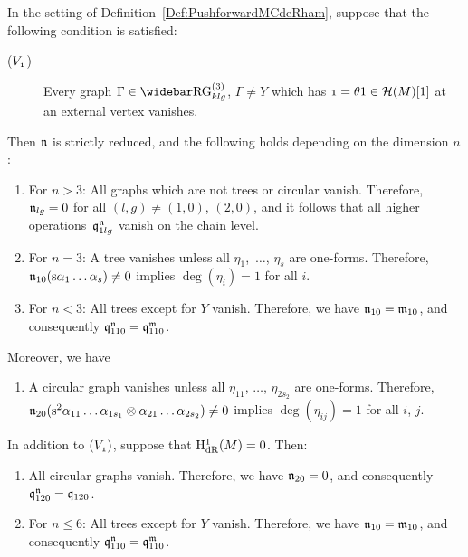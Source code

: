 \documentclass[\MainFolder/Text.tex]{subfiles}
\begin{document}
\begin{Proposition} \label{Prop:PMCEqualsMC}
In the setting of Definition~\ref{Def:PushforwardMCdeRham}, suppose that the following condition is satisfied: 
\begin{description}
\item[($V_{\NOne}$)] Every graph $\Gamma \in \TRRG_{klg}$, $\Gamma \neq Y$ which has $\NOne = \SuspU 1\in \Harm(M)[1]$ at an external vertex vanishes. 
\end{description}
Then $\mathfrak{n}$ is strictly reduced, and the following holds depending on the dimension $n$:
\begin{enumerate}[label=(\alph*)]
 \item For $n>3$: All graphs which are not trees or circular vanish. Therefore, $\mathfrak{n}_{lg} = 0$ for all $(l,g)\neq (1,0)$, $(2,0)$, and it follows that all higher operations~$\mathfrak{q}_{1lg}^{\mathfrak{n}}$ vanish on the chain level.
  \item For $n=3$: A tree vanishes unless all $\eta_{1}$,~$\dotsc$, $\eta_{s}$ are one-forms. Therefore, $\mathfrak{n}_{10}(\mathrm{s} \alpha_1 \dots \alpha_s) \neq 0$ implies $\deg(\eta_i)=1$ for all $i$.
 \item For $n<3$: All trees except for $Y$ vanish. Therefore, we have $\mathfrak{n}_{10} = \mathfrak{m}_{10}$, and consequently $\mathfrak{q}_{110}^{\mathfrak{n}} = \mathfrak{q}_{110}^{\mathfrak{m}}$.
\end{enumerate}
Moreover, we have 
\begin{enumerate}[resume,label=(\alph*)]
 \item A circular graph vanishes unless all $\eta_{11}$, $\dotsc$, $\eta_{2s_2}$ are one-forms. Therefore, $\mathfrak{n}_{20}(\mathrm{s}^2 \alpha_{11}\dots \alpha_{1s_1} \otimes \alpha_{21}\dots \alpha_{2s_2})\neq 0$ implies $\deg(\eta_{ij})=1$ for all $i$, $j$.
\end{enumerate}
In addition to $(V_{\NOne})$, suppose that $\mathrm{H}_{\mathrm{dR}}^1(M) = 0$. Then:
\begin{enumerate}[resume,label=(\alph*)]
 \item All circular graphs vanish. Therefore, we have $\mathfrak{n}_{20} = 0$, and consequently $\mathfrak{q}_{120}^{\mathfrak{n}} = \mathfrak{q}_{120}$.
\item For $n\le 6$: All trees except for $Y$ vanish. Therefore, we have $\mathfrak{n}_{10} = \mathfrak{m}_{10}$, and consequently $\mathfrak{q}_{110}^{\mathfrak{n}} = \mathfrak{q}_{110}^{\mathfrak{m}}$. 
\end{enumerate} 
\end{Proposition}
\end{document}
